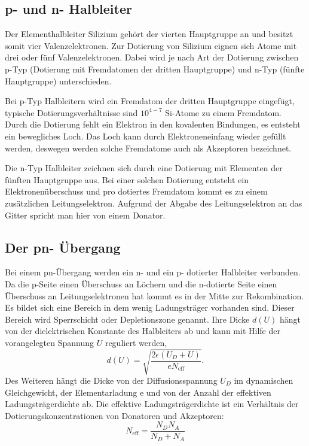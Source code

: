 \subsection{p- und n- Halbleiter}
Der Elementhalbleiter Silizium gehört der vierten Hauptgruppe an und besitzt somit
vier Valenzelektronen. Zur Dotierung von Silizium eignen sich Atome mit drei oder
fünf Valenzelektronen. Dabei wird je nach Art der Dotierung zwischen
p-Typ (Dotierung mit Fremdatomen der dritten Hauptgruppe) und n-Typ (fünfte Hauptgruppe)
unterschieden.

Bei p-Typ Halbleitern wird ein Fremdatom der dritten Hauptgruppe eingefügt,
typische Dotierungsverhältnisse sind $10^{4-7}$ Si-Atome zu einem Fremdatom.
Durch die Dotierung fehlt ein Elektron in den kovalenten Bindungen, es entsteht ein
bewegliches Loch. Das Loch kann durch Elektroneneinfang wieder gefüllt werden,
deswegen werden solche Fremdatome auch als Akzeptoren bezeichnet.

Die n-Typ Halbleiter zeichnen sich durch eine Dotierung mit Elementen der
fünften Hauptgruppe aus. Bei einer solchen Dotierung entsteht ein Elektronenüberschuss
und pro dotiertes Fremdatom kommt es zu einem zusätzlichen Leitungselektron. Aufgrund
der Abgabe des Leitungselektron an das Gitter spricht man hier von einem Donator.

\subsection{Der pn- Übergang}
Bei einem pn-Übergang werden ein n- und ein p- dotierter Halbleiter verbunden.
Da die p-Seite einen Überschuss an Löchern und die n-dotierte Seite einen Überschuss an
Leitungselektronen hat kommt es in der Mitte zur Rekombination. Es bildet sich
eine Bereich in dem wenig Ladungsträger vorhanden sind. Dieser Bereich
wird Sperrschicht oder Depletionszone genannt. Ihre Dicke $d(U)$ hängt von der
dielektrischen Konstante des Halbleiters ab und kann mit
Hilfe der vorangelegten Spannung $U$ reguliert werden,
\begin{equation}
    \label{depl}
    d(U)=\sqrt{ \frac{ 2 \epsilon (U_D +U ) }{e N_\text{eff}}}.
\end{equation}
Des Weiteren hängt die Dicke von der Diffusionsspannung $U_D$ im dynamischen Gleichgewicht,
der Elementarladung e und von der Anzahl der effektiven Ladungsträgerdichte ab. Die
effektive Ladungsträgerdichte ist ein Verhältnis der Dotierungskonzentrationen von
Donatoren und Akzeptoren:
$$N_\text{eff}=\frac{N_D N_A}{N_D +N_A}$$


